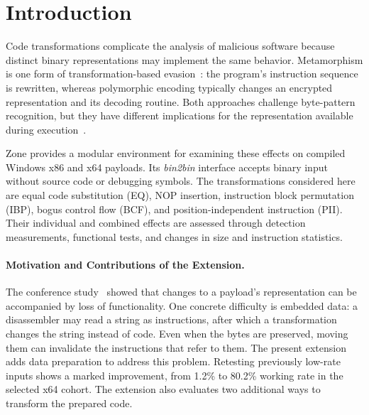 \documentclass[runningheads]{llncs}
\begin{document}
\section{Introduction}\label{sec:introduction}

Code transformations complicate the analysis of malicious software because distinct binary representations may implement the same behavior. Metamorphism is one form of transformation-based evasion~\cite{PEsurveybible}: the program's instruction sequence is rewritten, whereas polymorphic encoding typically changes an encrypted representation and its decoding routine. Both approaches challenge byte-pattern recognition, but they have different implications for the representation available during execution~\cite{metamorphic1,metamorphic2}.

Zone provides a modular environment for examining these effects on compiled Windows x86 and x64 payloads. Its \emph{bin2bin} interface accepts binary input without source code or debugging symbols. The transformations considered here are equal code substitution (EQ), NOP insertion, instruction block permutation (IBP), bogus control flow (BCF), and position-independent instruction (PII). Their individual and combined effects are assessed through detection measurements, functional tests, and changes in size and instruction statistics.

\paragraph{Motivation and Contributions of the Extension.}
The conference study~\cite{zone_secrypt_2026} showed that changes to a
payload's representation can be accompanied by loss of functionality.
One concrete difficulty is embedded data: a disassembler may read a string
as instructions, after which a transformation changes the string instead
of code. Even when the bytes are preserved, moving them can invalidate
the instructions that refer to them. The present extension adds data preparation to address this problem.
Retesting previously low-rate inputs shows a marked improvement, from
1.2\% to 80.2\% working rate in the selected x64 cohort. The extension
also evaluates two additional ways to transform the prepared code.
\end{document}
